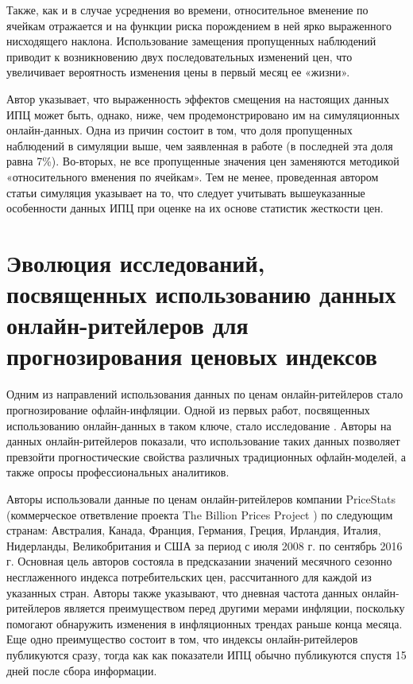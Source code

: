 Также, как и в случае усреднения во времени, относительное вменение по ячейкам отражается и на функции риска порождением в ней ярко выраженного нисходящего наклона. Использование замещения пропущенных наблюдений приводит к возникновению двух последовательных изменений цен, что увеличивает вероятность изменения цены в первый месяц ее «жизни». 

Автор указывает, что выраженность эффектов смещения на настоящих данных ИПЦ может быть, однако, ниже, чем продемонстрировано им на симуляционных онлайн-данных. Одна из причин состоит в том, что доля пропущенных наблюдений в симуляции выше, чем заявленная в работе \cite{klenow2008state} (в последней эта доля равна 7\%). Во-вторых, не все пропущенные значения цен заменяются методикой «относительного вменения по ячейкам». Тем не менее, проведенная автором статьи симуляция указывает на то, что следует учитывать вышеуказанные особенности данных ИПЦ при оценке на их основе статистик жесткости цен.

\section{Эволюция исследований, посвященных использованию данных онлайн-ритейлеров для прогнозирования ценовых индексов}\label{sec:ch1/sec2}

Одним из направлений использования данных по ценам онлайн-ритейлеров стало прогнозирование офлайн-инфляции. Одной из первых работ, посвященных использованию онлайн-данных в таком ключе, стало исследование \cite{aparicio2020forecasting}. Авторы на данных онлайн-ритейлеров показали, что использование таких данных позволяет превзойти прогностические свойства различных традиционных офлайн-моделей, а также опросы профессиональных аналитиков.

Авторы использовали данные по ценам онлайн-ритейлеров компании PriceStats (коммерческое ответвление проекта The Billion Prices Project \cite{cavallo2016billion}) по следующим странам: Австралия, Канада, Франция, Германия, Греция, Ирландия, Италия, Нидерланды, Великобритания и США за период с июля 2008 г. по сентябрь 2016 г. Основная цель авторов состояла в предсказании значений месячного сезонно несглаженного индекса потребительских цен, рассчитанного для каждой из указанных стран. Авторы также указывают, что дневная частота данных онлайн-ритейлеров является преимуществом перед другими мерами инфляции, поскольку помогают обнаружить изменения в инфляционных трендах раньше конца месяца. Еще одно преимущество состоит в том, что индексы онлайн-ритейлеров публикуются сразу, тогда как как показатели ИПЦ обычно публикуются спустя 15 дней после сбора информации.

